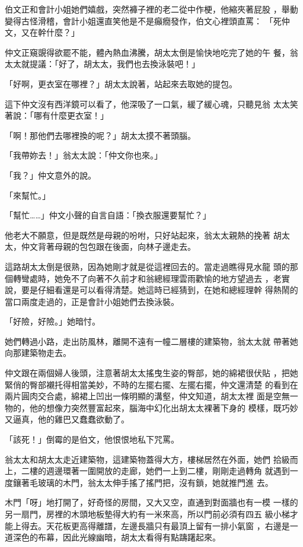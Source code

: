 伯文正和會計小姐她們嬉戲，突然褲子裡的老二從中作梗，他縮夾著屁股
，舉動變得古怪滑稽，會計小姐還直笑他是不是癲癇發作，伯文心裡頭直罵：
「死仲文，又在幹什麼？」

仲文正窺覬得欲罷不能，體內熱血沸騰，胡太太倒是愉快地吃完了她的午
餐，翁太太就提議：「好了，胡太太，我們也去換泳裝吧！」

「好啊，更衣室在哪裡？」胡太太說著，站起來去取她的提包。

這下仲文沒有西洋鏡可以看了，他深吸了一口氣，緩了緩心魂，只聽見翁
太太笑著說：「哪有什麼更衣室！」

「啊！那他們去哪裡換的呢？」胡太太摸不著頭腦。

「我帶妳去！」翁太太說：「仲文你也來。」

「我？」仲文意外的說。

「來幫忙。」

「幫忙……」仲文小聲的自言自語：「換衣服還要幫忙？」

他老大不願意，但是既然是母親的吩咐，只好站起來，翁太太親熱的挽著
胡太太，仲文背著母親的包包跟在後面，向林子邊走去。

這路胡太太倒是很熟，因為她剛才就是從這裡回去的。當走過瞧得見水龍
頭的那個轉彎處時，她免不了向著不久前才和翁總經理雲雨歡愉的地方望過去
，老實說，要是仔細看還是可以看得清楚。她這時已經猜到，在她和總經理幹
得熱鬧的當口兩度走過的，正是會計小姐她們去換泳裝。

「好險，好險。」她暗忖。

她們轉過小路，走出防風林，離開不遠有一幢二層樓的建築物，翁太太就
帶著她向那建築物走去。

仲文跟在兩個婦人後頭，注意著胡太太搖曳生姿的臀部，她的綿裙很伏貼
，把她緊俏的臀部襯托得相當美妙，不時的左擺右擺、左擺右擺，仲文還清楚
的看到在兩片圓肉交合處，綿裙上凹出一條明顯的溝壑，仲文知道，胡太太裡
面是空無一物的，他的想像力突然豐富起來，腦海中幻化出胡太太裸著下身的
模樣，既巧妙又逼真，他的雞巴又蠢蠢欲動了。

「該死！」倒霉的是伯文，他恨恨地私下咒罵。

翁太太和胡太太走近建築物，這建築物蓋得大方，樓梯居然在外面，她們
拾級而上，二樓的週邊環著一圍開放的走廊，她們一上到二樓，剛剛走過轉角
就遇到一度鑲著毛玻璃的木門，翁太太伸手搖了搖門把，沒有鎖，她就推門進
去。

木門「呀」地打開了，好奇怪的房間，又大又空，直通到對面牆也有一模
一樣的另一扇門，房裡的木頭地板墊得大約有一米來高，所以門前必須有四五
級小梯才能上得去。天花板更高得離譜，左邊長牆只有最頂上留有一排小氣窗
，右邊是一道深色的布幕，因此光線幽暗，胡太太看得有點躊躇起來。

